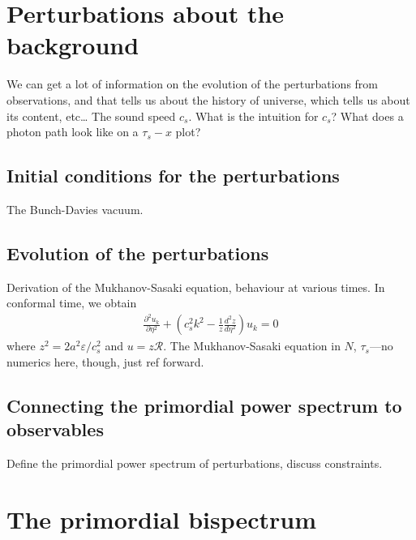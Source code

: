 \section{Perturbations about the background}
    We can get a lot of information on the evolution of the perturbations
    from observations, and that tells us about the history of universe,
    which tells us about its content, etc\ldots
    \newpage
    The sound speed $c_s$. What is the intuition for $c_s$?
    What does a photon path look like on a $\tau_s-x$ plot?
    \newpage
    \subsection{Initial conditions for the perturbations}
    The Bunch-Davies vacuum.
    \newpage
    \subsection{Evolution of the perturbations}
    Derivation of the Mukhanov-Sasaki equation, behaviour at various times.
    In conformal time, we obtain
    \begin{align}\label{modefneqn_tau}
        \frac{\partial^2 u_k}{\partial \eta^2} + \left(c_s^2k^2 - \frac{1}{z}\frac{d^2 z}{d \eta^2}\right)u_k = 0
    \end{align}
    where $z^2 = 2a^2\varepsilon/c_s^2$ and $u=z\mathcal{R}$.
    \newpage
    The Mukhanov-Sasaki equation in $N$, $\tau_s$---no numerics here, though, just ref forward.
    \newpage
    \subsection{Connecting the primordial power spectrum to observables}
    Define the primordial power spectrum of perturbations, discuss constraints.
\newpage
\section{The primordial bispectrum}
